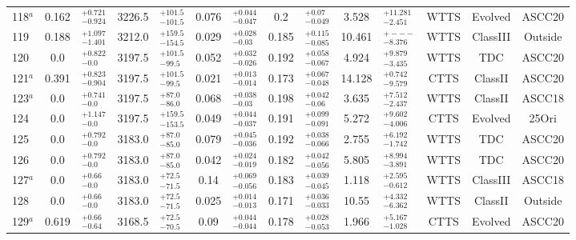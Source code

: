 \documentclass[12pt]{article}
\begin{document}
\begin{table}
\begin{threeparttable}
\begin{tabular}{lclclclclclccc}
 	118$^a $    & 0.162 & $^{+0.721}_{-0.924}$ & 3226.5 & $^{+101.5 }_{-101.5}$ & 0.076 & $^{+0.044 }_{-0.047}$ & 0.2   & $^{+0.07  }_{-0.049}$ & 3.528  & $^{+11.281 }_{-2.451}$  & WTTS & Evolved  & ASCC20        \\
 	119         & 0.188 & $^{+1.097}_{-1.401}$ & 3212.0 & $^{+159.5 }_{-154.5}$ & 0.029 & $^{+0.028 }_{-0.03 }$ & 0.185 & $^{+0.115 }_{-0.085}$ & 10.461 & $^{+---    }_{-8.376}$  & WTTS & ClassIII & Outside       \\
 	120         & 0.0   & $^{+0.822}_{-0.0  }$ & 3197.5 & $^{+101.5 }_{-99.5 }$ & 0.052 & $^{+0.032 }_{-0.026}$ & 0.192 & $^{+0.058 }_{-0.067}$ & 4.924  & $^{+9.879  }_{-3.435}$  & WTTS & TDC      & ASCC20        \\
 	121$^a $    & 0.391 & $^{+0.823}_{-0.904}$ & 3197.5 & $^{+101.5 }_{-99.5 }$ & 0.021 & $^{+0.013 }_{-0.014}$ & 0.173 & $^{+0.067 }_{-0.048}$ & 14.128 & $^{+0.742  }_{-9.579}$  & CTTS & ClassII  & ASCC20        \\
 	123$^a $    & 0.0   & $^{+0.741}_{-0.0  }$ & 3197.5 & $^{+87.0  }_{-86.0 }$ & 0.068 & $^{+0.038 }_{-0.03 }$ & 0.198 & $^{+0.042 }_{-0.06 }$ & 3.635  & $^{+7.512  }_{-2.437}$  & WTTS & ClassII  & ASCC18        \\
 	124         & 0.0   & $^{+1.147}_{-0.0  }$ & 3197.5 & $^{+159.5 }_{-153.5}$ & 0.049 & $^{+0.044 }_{-0.037}$ & 0.191 & $^{+0.099 }_{-0.091}$ & 5.272  & $^{+9.602  }_{-4.006}$  & CTTS & Evolved  & 25Ori         \\
 	125         & 0.0   & $^{+0.792}_{-0.0  }$ & 3183.0 & $^{+87.0  }_{-85.0 }$ & 0.079 & $^{+0.045 }_{-0.036}$ & 0.192 & $^{+0.038 }_{-0.066}$ & 2.755  & $^{+6.192  }_{-1.742}$  & WTTS & TDC      & ASCC20        \\
 	126         & 0.0   & $^{+0.792}_{-0.0  }$ & 3183.0 & $^{+87.0  }_{-85.0 }$ & 0.042 & $^{+0.024 }_{-0.019}$ & 0.182 & $^{+0.042 }_{-0.056}$ & 5.805  & $^{+8.994  }_{-3.891}$  & WTTS & TDC      & ASCC20        \\
 	127$^a $    & 0.0   & $^{+0.66 }_{-0.0  }$ & 3183.0 & $^{+72.5  }_{-71.5 }$ & 0.14  & $^{+0.069 }_{-0.056}$ & 0.183 & $^{+0.039 }_{-0.045}$ & 1.118  & $^{+2.595  }_{-0.612}$  & WTTS & ClassIII & ASCC18        \\
 	128         & 0.0   & $^{+0.66 }_{-0.0  }$ & 3183.0 & $^{+72.5  }_{-71.5 }$ & 0.025 & $^{+0.014 }_{-0.013}$ & 0.171 & $^{+0.036 }_{-0.033}$ & 10.55  & $^{+4.332  }_{-6.362}$  & WTTS & ClassII  & Outside       \\
 	129$^a $    & 0.619 & $^{+0.66 }_{-0.64 }$ & 3168.5 & $^{+72.5  }_{-70.5 }$ & 0.09  & $^{+0.044 }_{-0.044}$ & 0.178 & $^{+0.028 }_{-0.053}$ & 1.966  & $^{+5.167  }_{-1.028}$  & CTTS & Evolved  & ASCC20        \\

\end{tabular}
\end{threeparttable}
\end{table}
\end{document}
